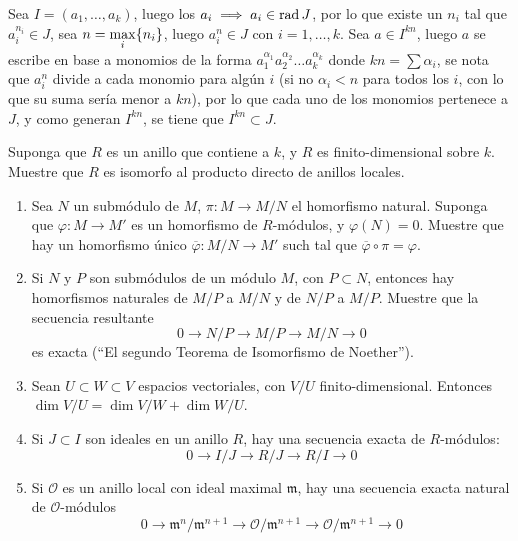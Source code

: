 \begin{sol}{2.41}
    Sea \(I=(a_1,\dots, a_k)\), luego los \(a_i\implies a_i\in\operatorname{rad} J\), por lo que existe un \(n_i\) tal que \(a_i^{n_i}\in J\), sea \(\displaystyle n=\max_i\{n_i\}\), luego \(a_i^n\in J\) con \(i=1,\dots, k\). Sea \(a
    \in I^{kn}\), luego \(a\) se escribe en base a monomios de la forma \(a_1^{\alpha_1}a_2^{\alpha_2}\dots a_k^{\alpha_k}\) donde \(kn=\sum\alpha_i\), se nota que \(a_i^n\) divide a cada monomio para algún \(i\) (si no \(\alpha_i<n\) para todos los \(i\), con lo que su suma sería menor a \(kn\)), por lo que cada uno de los monomios pertenece a \(J\), y como generan \(I^{kn}\), se tiene que \(I^{kn}\subset J\).
\end{sol}

\begin{prob}{2.47}
    Suponga que \(R\) es un anillo que contiene a \(k\), y \(R\) es finito-dimensional sobre \(k\). Muestre que \(R\) es isomorfo al producto directo de anillos locales.
\end{prob}

\begin{sol}{2.47}

\end{sol}

\begin{prob}{2.49}
    \begin{enumerate}
        \item Sea \(N\) un submódulo de \(M\), \(\pi:M\rightarrow M/N\) el homorfismo natural. Suponga que \(\varphi:M\rightarrow M'\) es un homorfismo de \(R\)-módulos, y \(\varphi(N)=0\). Muestre que hay un homorfismo único \(\overline{\varphi}:M/N\rightarrow M'\) such tal que \(\overline{\varphi}\circ\pi=\varphi\).
        \item Si \(N\) y \(P\) son submódulos de un módulo \(M\), con \(P\subset N\), entonces hay homorfismos naturales de \(M/P\) a \(M/N\) y de \(N/P\) a \(M/P\). Muestre que la secuencia resultante
              \[
                  0\rightarrow N/P\rightarrow  M/P\rightarrow M/N\rightarrow 0
              \]
              es exacta (``El segundo Teorema de Isomorfismo de Noether'').
        \item Sean \(U\subset W\subset V\) espacios vectoriales, con \(V/U\) finito-dimensional. Entonces \(\dim V/U=\dim V/W+\dim W/U\).
        \item Si \(J\subset I\) son ideales en un anillo \(R\), hay una secuencia exacta de \(R\)-módulos:
              \[
                  0\rightarrow I/J\rightarrow R/J\rightarrow R/I\rightarrow 0
              \]
        \item Si \(\mathcal{O}\) es un anillo local con ideal maximal \(\mathfrak{m}\), hay una secuencia exacta natural de \(\mathcal{O}\)-módulos
              \[
                  0\rightarrow\mathfrak{m}^n/\mathfrak{m}^{n+1}\rightarrow\mathcal{O}/\mathfrak{m}^{n+1}\rightarrow\mathcal{O}/\mathfrak{m}^{n+1}\rightarrow 0
              \]
    \end{enumerate}
\end{prob}


